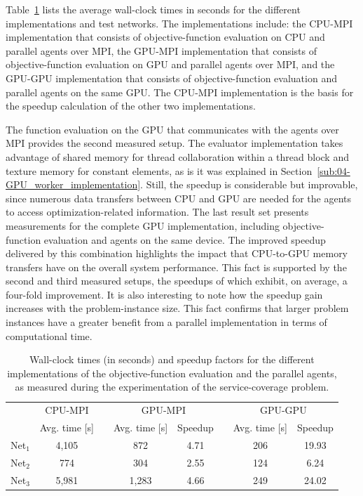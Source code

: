 Table~\ref{tab:06-Performance_analysis} lists the average wall-clock
times in seconds for the different implementations and test networks.
The implementations include: the CPU-MPI implementation that consists
of objective-function evaluation on CPU and parallel agents over MPI,
the GPU-MPI implementation that consists of objective-function evaluation
on GPU and parallel agents over MPI, and the GPU-GPU implementation
that consists of objective-function evaluation and parallel agents
on the same GPU. The CPU-MPI implementation is the basis for the speedup
calculation of the other two implementations.

The function evaluation on the GPU that communicates with the agents
over MPI provides the second measured setup. The evaluator implementation
takes advantage of shared memory for thread collaboration within a
thread block and texture memory for constant elements, as is it was
explained in Section~\ref{sub:04-GPU_worker_implementation}. Still,
the speedup is considerable but improvable, since numerous data transfers
between CPU and GPU are needed for the agents to access optimization-related
information. The last result set presents measurements for the complete
GPU implementation, including objective-function evaluation and agents
on the same device. The improved speedup delivered by this combination
highlights the impact that CPU-to-GPU memory transfers have on the
overall system performance. This fact is supported by the second and
third measured setups, the speedups of which exhibit, on average,
a four-fold improvement. It is also interesting to note how the speedup
gain increases with the problem-instance size. This fact confirms
that larger problem instances have a greater benefit from a parallel
implementation in terms of computational time.

\begin{table}
\caption{Wall-clock times (in seconds) and speedup factors for the different
implementations of the objective-function evaluation and the parallel
agents, as measured during the experimentation of the service-coverage
problem.\label{tab:06-Performance_analysis}}


\centering

\begin{tabular}{cccccccc}
\cmidrule{2-8} 
 & \multicolumn{1}{c}{CPU-MPI} &  & \multicolumn{2}{c}{GPU-MPI} &  & \multicolumn{2}{c}{GPU-GPU}\tabularnewline\addlinespace
\cmidrule{2-2} \cmidrule{4-5} \cmidrule{7-8} 
 & Avg. time {[}s{]} &  & Avg. time {[}s{]} & Speedup &  & Avg. time {[}s{]} & Speedup\tabularnewline\addlinespace
\cmidrule{1-2} \cmidrule{4-5} \cmidrule{7-8} 
Net$_{1}$ & 4,105 &  & 872 & 4.71 &  & 206 & 19.93\tabularnewline
Net$_{2}$ & 774 &  & 304 & 2.55 &  & 124 & 6.24\tabularnewline
Net$_{3}$ & 5,981 &  & 1,283 & 4.66 &  & 249 & 24.02\tabularnewline
\bottomrule
\end{tabular}
\end{table}



